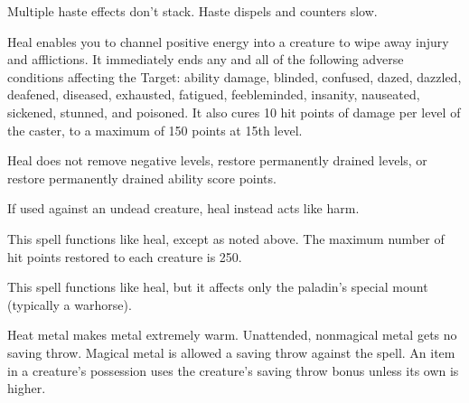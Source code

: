 \begin{multicols}{2}
\begin{small}
\smallskip\noindent Multiple haste effects don't stack. Haste dispels and counters slow.


\noindent Heal enables you to channel positive energy into a creature to wipe away injury and afflictions. It immediately ends any and all of the following adverse conditions affecting the Target: ability damage, blinded, confused, dazed, dazzled, deafened, diseased, exhausted, fatigued, feebleminded, insanity, nauseated, sickened, stunned, and poisoned. It also cures 10 hit points of damage per level of the caster, to a maximum of 150 points at 15th level.

\smallskip\noindent Heal does not remove negative levels, restore permanently drained levels, or restore permanently drained ability score points.

\smallskip\noindent If used against an undead creature, heal instead acts like harm.

\noindent This spell functions like heal, except as noted above. The maximum number of hit points restored to each creature is 250.

\noindent This spell functions like heal, but it affects only the paladin's special mount (typically a warhorse).

\noindent Heat metal makes metal extremely warm. Unattended, nonmagical metal gets no saving throw. Magical metal is allowed a saving throw against the spell. An item in a creature's possession uses the creature's saving throw bonus unless its own is higher.


\end{small}
\end{multicols}
